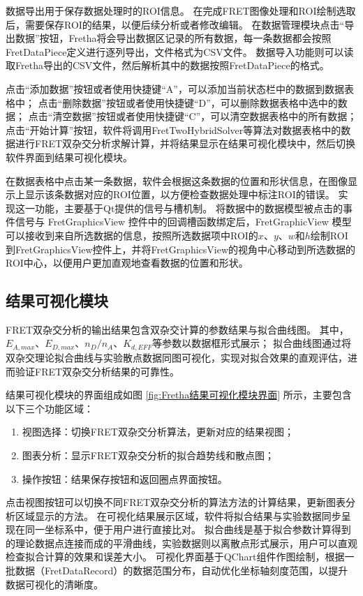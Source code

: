 数据导出用于保存数据处理时的ROI信息。
在完成FRET图像处理和ROI绘制选取后，需要保存ROI的结果，以便后续分析或者修改编辑。
在数据管理模块点击“导出数据”按钮，Fretha将会导出数据区记录的所有数据，每一条数据都会按照FretDataPiece定义进行逐列导出，文件格式为CSV文件。
数据导入功能则可以读取Fretha导出的CSV文件，然后解析其中的数据按照FretDataPiece的格式。

点击“添加数据”按钮或者使用快捷键“A”，可以添加当前状态栏中的数据到数据表格中；
点击“删除数据”按钮或者使用快捷键“D”，可以删除数据表格中选中的数据；
点击“清空数据”按钮或者使用快捷键“C”，可以清空数据表格中的所有数据；
点击“开始计算”按钮，软件将调用FretTwoHybridSolver等算法对数据表格中的数据进行FRET双杂交分析求解计算，并将结果显示在结果可视化模块中，然后切换软件界面到结果可视化模块。

在数据表格中点击某一条数据，软件会根据这条数据的位置和形状信息，在图像显示上显示该条数据对应的ROI位置，以方便检查数据处理中标注ROI的错误。
实现这一功能，主要基于Qt提供的信号与槽机制。
将数据中的数据模型被点击的事件信号与 FretGraphicsView 控件中的回调槽函数绑定后，FretGraphicView 模型可以接收到来自所选数据的信息，按照所选数据项中ROI的$x$、$y$、$w$和$h$绘制ROI到FretGraphicsView控件上，并将FretGraphicsView的视角中心移动到所选数据的ROI中心，以便用户更加直观地查看数据的位置和形状。

\subsection{结果可视化模块}
\label{sec:结果可视化模块}
\ifshowtext
FRET双杂交分析的输出结果包含双杂交计算的参数结果与拟合曲线图。
其中，$E_{A,max}$、$E_{D,max}$、$n_D/n_A$、$K_{d,EFF}$等参数以数据框形式展示；
拟合曲线图通过将双杂交理论拟合曲线与实验散点数据同图可视化，实现对拟合效果的直观评估，进而验证FRET双杂交分析结果的可靠性。

结果可视化模块的界面组成如图 \ref{fig:Fretha结果可视化模块界面} 所示，主要包含以下三个功能区域：
\begin{enumerate}
  \item 视图选择：切换FRET双杂交分析算法，更新对应的结果视图；
  \item 图表分析：显示FRET双杂交分析的拟合趋势线和散点图；
  \item 操作按钮：结果保存按钮和返回圈点界面按钮。
\end{enumerate}

点击视图按钮可以切换不同FRET双杂交分析的算法方法的计算结果，更新图表分析区域显示的方法。
在可视化结果展示区域，软件将拟合结果与实验数据同步呈现在同一坐标系中，便于用户进行直接比对。
拟合曲线是基于拟合参数计算得到的理论数据点连接而成的平滑曲线，实验数据则以离散点形式展示，用户可以直观检查拟合计算的效果和误差大小。
可视化界面基于QChart组件作图绘制，根据一批数据（FretDataRecord）的数据范围分布，自动优化坐标轴刻度范围，以提升数据可视化的清晰度。

